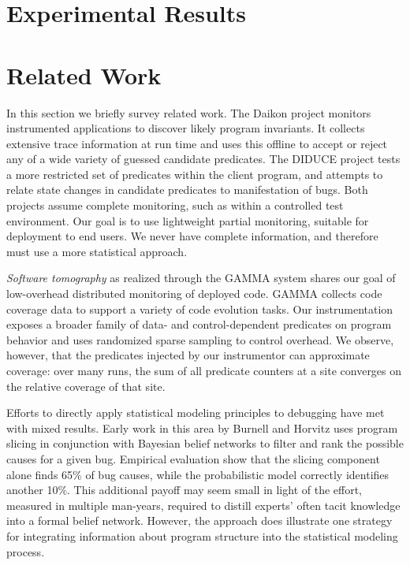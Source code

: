 \documentclass[draft]{sig-alternate}
\newcommand{\termdef}[1]{\textit{#1}}
\begin{document}
\section{Experimental Results}
\label{sec:experiments:results}



\section{Related Work}
\label{sec:related-work}

In this section we briefly survey related work.
The Daikon project \cite{ernst2001} monitors instrumented applications
to discover likely program invariants.  It collects extensive trace
information at run time and uses this offline to accept or reject any
of a wide variety of guessed candidate predicates.  The DIDUCE project
\cite{ICSE02*291} tests a more restricted set of predicates within the
client program, and attempts to relate state changes in candidate
predicates to manifestation of bugs.  Both projects assume complete
monitoring, such as within a controlled test environment.  Our goal is
to use lightweight partial monitoring, suitable for deployment to end
users.  We never have complete information, and therefore must use a
more statistical approach.

\termdef{Software tomography} as realized through the GAMMA system
\cite{PASTE'02*2,Orso:2003:LFDIART} shares our goal of low-overhead
distributed monitoring of deployed code.  GAMMA collects code coverage
data to support a variety of code evolution tasks.  Our
instrumentation exposes a broader family of data- and
control-dependent predicates on program behavior and uses randomized
sparse sampling to control overhead.  We observe, however, that the
predicates injected by our instrumentor can approximate coverage: over
many runs, the sum of all predicate counters at a site converges on
the relative coverage of that site.

Efforts to directly apply statistical modeling principles to debugging
have met with mixed results.  Early work in this area by Burnell and
Horvitz \cite{Burnell:1995:SCM} uses program slicing in conjunction
with Bayesian belief networks to filter and rank the possible causes
for a given bug.  Empirical evaluation show that the slicing component
alone finds 65\% of bug causes, while the probabilistic model
correctly identifies another 10\%.  This additional payoff may seem
small in light of the effort, measured in multiple
man-years, required to distill experts' often tacit knowledge into a
formal belief network.  However, the approach does illustrate one
strategy for integrating information about program structure into the
statistical modeling process.
\end{document}
